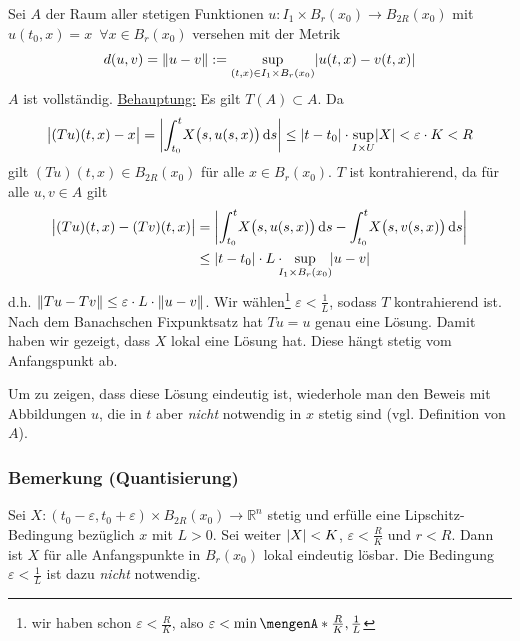 Sei $A$ der Raum aller stetigen Funktionen $u : I_1 \times B_r(x_0) \to B_{2R}(x_0)$ mit $u(t_0, x) = x \enspace \forall x \in B_r(x_0)$ versehen mit der Metrik
\[
	d(u,v) = \norm{u -v} := \sup_{(t,x)\in I_1 \times B_r(x_0)} \abs*{u(t,x)- v(t,x)} 
\]
$A$ ist vollständig. \uline{Behauptung:} Es gilt $T(A) \subset A$. Da
\begin{align*}
	\abs[\big]{(T u)(t,x) - x} = \abs*{ \int_{t_0} ^{t} \! X \enbrace[\big]{s, u(s,x)}  \, \mathrm{d}s  }  \le \abs*{t- t_0}\cdot \sup_{I \times U} \abs*{X}  
	< \varepsilon \cdot K < R 
\end{align*}
gilt $(T u)(t,x) \in B_{2 R}(x_0)$ für alle $x \in B_r(x_0)$. $T$ ist kontrahierend, da für alle $u,v \in A$ gilt
\begin{align*}
	\abs[\big]{(T u)(t,x)- (T v)(t,x)} &= \abs*{\int_{t_0} ^{t} \! X \enbrace[\big]{s, u(s,x)} \, \mathrm{d}s - \int_{t_0} ^{t} \!X \enbrace[\big]{s, v(s,x)}\, 
	\mathrm{d}s} \\
	&\le \abs*{t- t_0} \cdot L \cdot \! \!\! \sup_{I_1 \times B_r(x_0)} \!\abs*{u-v}    
\end{align*}
d.h. $\norm{T u - T v} \le \varepsilon \cdot L \cdot \norm{u-v}$. Wir wählen\footnote{wir haben schon $\varepsilon < \frac{R}{K}$, also 
$\varepsilon < \min \set{\frac{R}{K}, \frac{1}{L}} $} $\varepsilon < \frac{1}{L}$, sodass $T$ kontrahierend ist. Nach dem Banachschen Fixpunktsatz
hat $T u = u$ genau eine Lösung. Damit haben wir gezeigt, dass $X$ lokal eine Lösung hat. Diese hängt stetig vom Anfangspunkt ab. 

Um zu zeigen, dass diese Lösung eindeutig
ist, wiederhole man den Beweis mit Abbildungen $u$, die in $t$ aber \emph{nicht} notwendig in $x$ stetig sind (vgl. Definition von $A$). \bewende

\subsubsection{Bemerkung (Quantisierung)} %
\label{ssub:232}
Sei $X : (t_0 - \varepsilon, t_0 +\varepsilon) \times B_{2R}(x_0) \to \mathds{R}^n$ stetig und erfülle eine Lipschitz-Bedingung bezüglich $x$ mit $L >0$. Sei weiter 
$\abs*{X} < K $, $\varepsilon < \frac{R}{K}$ und $r < R$. Dann ist $X$ für alle Anfangspunkte in $B_r(x_0)$ lokal eindeutig lösbar. Die Bedingung 
$\varepsilon < \frac{1}{L} $ ist dazu \emph{nicht} notwendig.

